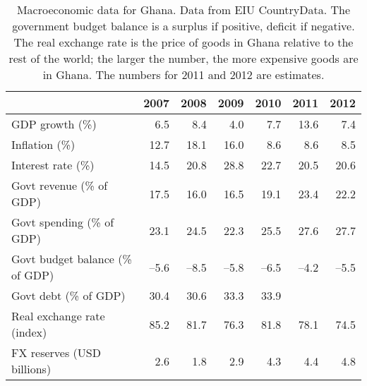 \documentclass[letterpaper,12pt]{exam}
\begin{document}
\begin{questions}

\begin{table}
\centering
\begin{tabular}{lrrrrrr}
\toprule
        & 2007 & 2008 & 2009 & 2010 & 2011 & 2012 \\
\midrule
GDP growth (\%) & 6.5 & 8.4 & 4.0 & 7.7 & 13.6 & 7.4 \\
Inflation (\%)  & 12.7& 18.1 & 16.0 & 8.6 & 8.6 & 8.5 \\
Interest rate (\%) & 14.5 & 20.8 & 28.8 & 22.7 & 20.5 & 20.6  \\
Govt revenue (\% of GDP)  & 17.5 & 16.0 & 16.5 & 19.1 & 23.4 & 22.2 \\
Govt spending (\% of GDP) & 23.1 & 24.5 & 22.3 & 25.5 & 27.6 & 27.7 \\
Govt budget balance (\% of GDP) & --5.6 & --8.5 & --5.8 & --6.5& --4.2 & --5.5\\
Govt debt (\% of GDP) & 30.4 & 30.6 & 33.3 & 33.9 & {\bf } & {\bf } \\ %
Real exchange rate (index) & 85.2 & 81.7 & 76.3 & 81.8 & 78.1 & 74.5\\
FX reserves (USD billions) & 2.6 & 1.8 & 2.9 & 4.3 & 4.4 & 4.8 \\
\bottomrule
\end{tabular}
\caption{Macroeconomic data for Ghana.
Data from EIU CountryData.
The government budget balance is a surplus if positive, deficit if negative.
The real exchange rate is the price of goods in Ghana relative to the rest
of the world;
the larger the number, the more expensive goods are in Ghana.
The numbers for 2011 and 2012 are estimates.
}
\label{tab:ghana}
\end{table}


\begin{solution}
\begin{parts}

\end{parts}
\end{solution}
\end{questions}
\end{document}
